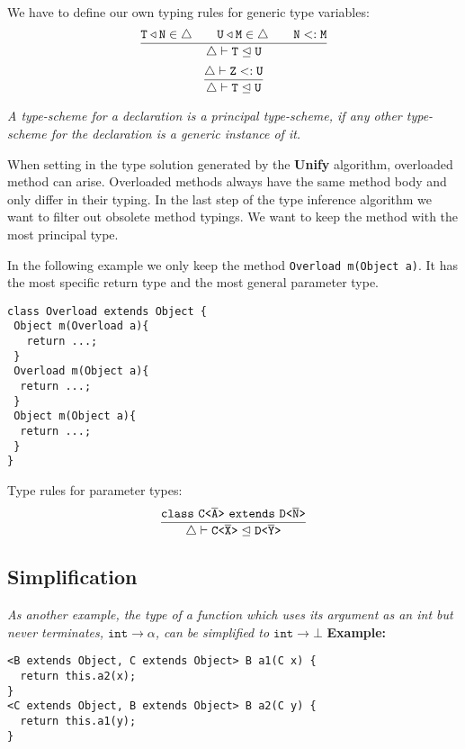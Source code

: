 \documentclass[a4paper,USenglish,cleveref, autoref, thm-restate]{lipics-v2021}
\begin{document}
We have to define our own typing rules for generic type variables:
\begin{align*}
\frac{\displaystyle \mathtt{
  T \triangleleft N \in \triangle \quad \quad U \triangleleft M \in \triangle \quad \quad 
  N <: M
  }
}{\displaystyle \mathtt{\triangle \vdash T \trianglelefteq U}}
\end{align*}
\begin{align*}
\frac{\displaystyle \mathtt{
  \triangle \vdash Z <: U
  }
}{\displaystyle \mathtt{\triangle \vdash T \trianglelefteq U}}
\end{align*}

\emph{A type-scheme for a declaration is a \emph{principal type-scheme}, if any
    other type-scheme for the 
declaration is a generic instance of it.}\cite{DM82}

When setting in the type solution generated by the \textbf{Unify} algorithm,
overloaded method can arise.
Overloaded methods always have the same method body and only differ in their typing.
In the last step of the type inference algorithm we want to filter out obsolete method typings.
We want to keep the method with the most principal type.

In the following example we only keep the method
\texttt{Overload m(Object a)}.
It has the most specific return type and the most general parameter type.
\begin{lstlisting}
class Overload extends Object {
 Object m(Overload a){
   return ...;
 }
 Overload m(Object a){
  return ...;
 }
 Object m(Object a){
  return ...;
 }
}
\end{lstlisting}

Type rules for parameter types:
\begin{align*}
  \ddfrac{\mathtt{    
    \texttt{class}\ \exptype{C}{\ol{A}}\ \texttt{extends}\ \exptype{D}{\ol{N}}
    }
  }{\mathtt{\triangle \vdash \exptype{C}{\ol{X}} \trianglelefteq \exptype{D}{\ol{Y}}}}
\end{align*}




\subsection{Simplification}
\emph{As another example, the type of a function which uses its argument as an int but never terminates,
$\texttt{int} \to \alpha$, can be simplified to $\texttt{int} \to \bot$}
\cite{10.1145/3409006}
\textbf{Example:}
\begin{lstlisting}
<B extends Object, C extends Object> B a1(C x) {
  return this.a2(x);
}
<C extends Object, B extends Object> B a2(C y) {
  return this.a1(y);
}
\end{lstlisting}
\end{document}

